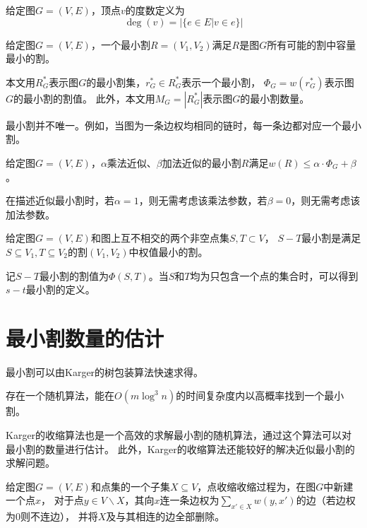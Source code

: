 \begin{definition}[点的度数]
    给定图$G=(V,E)$，顶点$v$的度数定义为
    \begin{equation}
        \deg(v)=|\{e\in E|v\in e\}|
    \end{equation}
\end{definition}
\begin{definition}
    给定图$G=(V,E)$，一个最小割$R=(V_1,V_2)$满足$R$是图$G$所有可能的割中容量最小的割。
\end{definition}
    本文用$R^*_{G}$表示图$G$的最小割集，$r^*_{G}\in R^*_{G}$表示一个最小割，
    $\Phi_G=w(r^*_{G})$表示图$G$的最小割的割值。
    此外，本文用$M_G=|R^*_{G}|$表示图$G$的最小割数量。

    最小割并不唯一。例如，当图为一条边权均相同的链时，每一条边都对应一个最小割。
\begin{definition}
    给定图$G=(V,E)$，$\alpha$乘法近似、$\beta$加法近似的最小割$R$满足$w(R)\leq \alpha ·\Phi_G+\beta$。
\end{definition}
在描述近似最小割时，若$\alpha=1$，则无需考虑该乘法参数，若$\beta=0$，则无需考虑该加法参数。
\begin{definition}[$S-T$最小割]
    给定图$G=(V,E)$和图上互不相交的两个非空点集$S,T\subset V$，
    $S-T$最小割是满足$S\subseteq V_1,T\subseteq V_2$的割$(V_1,V_2)$中权值最小的割。
\end{definition}
记$S-T$最小割的割值为$\Phi(S,T)$。当$S$和$T$均为只包含一个点的集合时，可以得到$s-t$最小割的定义。


\section{最小割数量的估计}

最小割可以由Karger的树包装算法快速求得。

\begin{theorem}[最小割算法]\cite{karger2000minimum}
    \label{the:mincut}
    存在一个随机算法，能在$O(m\log^3n)$的时间复杂度内以高概率找到一个最小割。
\end{theorem}

Karger的收缩算法也是一个高效的求解最小割的随机算法，通过这个算法可以对最小割的数量进行估计。
此外，Karger的收缩算法还能较好的解决近似最小割的求解问题。

\begin{definition}[点收缩]
    给定图$G=(V,E)$和点集的一个子集$X\subseteq V$，点收缩收缩过程为，在图$G$中新建一个点$x$，
    对于点$y\in V\backslash X$，其向$x$连一条边权为$\sum_{x'\in X}w(y,x')$的边（若边权为$0$则不连边），
    并将$X$及与其相连的边全部删除。
\end{definition}

